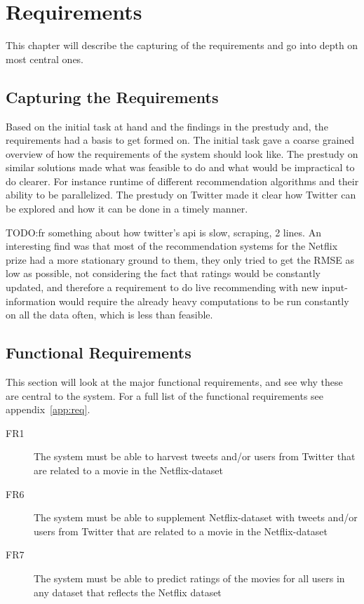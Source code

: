 
\chapter{Requirements}

\minitoc

This chapter will describe the capturing of the requirements and go into depth on most central ones.

\clearpage

\section{Capturing the Requirements}
Based on the initial task at hand and the findings in the prestudy and, the requirements had a basis to get formed on. The initial task gave a coarse grained overview of how the requirements of the system should look like. The prestudy on similar solutions made what was feasible to do and what would be impractical to do clearer. For instance runtime of different recommendation algorithms and their ability to be parallelized. The prestudy on Twitter made it clear how Twitter can be explored and how it can be done in a timely manner.

TODO:fr something about how twitter's api is slow, scraping, 2 lines.
An interesting find was that most of the recommendation systems for the Netflix prize had a more stationary ground to them, they only tried to get the RMSE as low as possible, not considering the fact that ratings would be constantly updated, and therefore a requirement to do live recommending with new input-information would require the already heavy computations to be run constantly on all the data often, which is less than feasible.


\section{Functional Requirements}\label{section:functional-requirements}
This section will look at the major functional requirements, and see why these are central to the system. For a full list of the functional requirements see appendix~\ref{app:req}.
\begin{description}
  \item[FR1] The system must be able to harvest tweets and/or users from Twitter that are related to a movie in the Netflix-dataset
  \item[FR6] The system must be able to supplement Netflix-dataset with tweets and/or users from Twitter that are related to a movie in the Netflix-dataset
  \item[FR7] The system must be able to predict ratings of the movies for all users in any dataset that reflects the Netflix dataset
\end{description}


